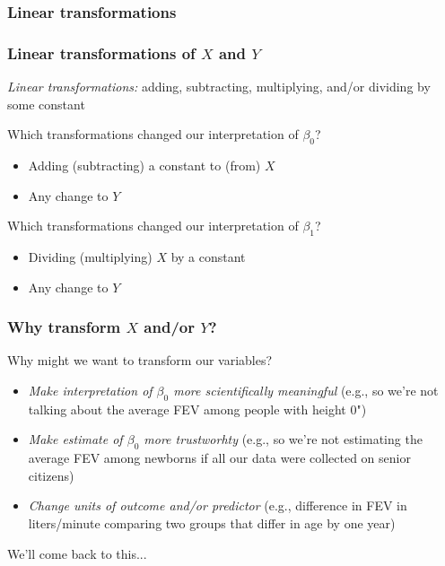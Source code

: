 \documentclass[12pt, 
hyperref={colorlinks=true, linkcolor=blue, urlcolor=cyan}]{beamer}
\begin{document}
\subsubsection{Linear transformations}
\begin{frame}
\frametitle{Linear transformations of $X$ and $Y$}

\textit{Linear transformations:} adding, subtracting, multiplying, and/or dividing by some constant

Which transformations changed our interpretation of $\beta_0$?\vspace{-0.3cm}\pause
\begin{itemize}
\item[] Adding (subtracting) a constant to (from) $X$
\item[] Any change to $Y$\pause
\end{itemize}

Which transformations changed our interpretation of $\beta_1$?\pause
\vspace{-0.3cm}
\begin{itemize}
\item[] Dividing (multiplying) $X$ by a constant  
\item[] Any change to $Y$
\end{itemize}
\end{frame}

\begin{frame}
\frametitle{Why transform $X$ and/or $Y$?}
Why might we want to transform our variables? 
\begin{itemize}
\item \textit{Make interpretation of $\beta_0$ more scientifically meaningful} (e.g., so we're not talking about the average FEV among people with height 0")
\item \textit{Make estimate of $\beta_0$ more trustworhty} (e.g., so we're not estimating the average FEV among newborns if all our data were collected on senior citizens)
\item \textit{Change units of outcome and/or predictor} (e.g., difference in FEV in liters/minute comparing two groups that differ in age by one year)
\end{itemize}

We'll come back to this...
\end{frame}
\end{document}
